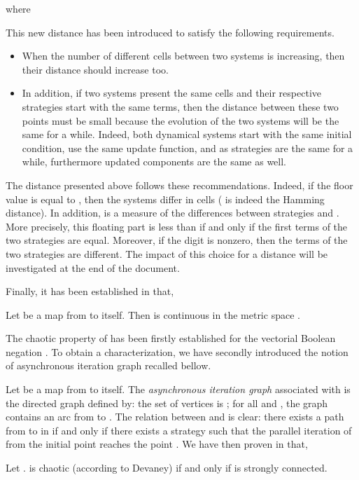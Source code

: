 \documentclass{article}
\begin{document}
\noindent where



This new distance has been introduced to satisfy the following requirements.
\begin{itemize}
\item When the number of different cells between two systems is increasing, then
their distance should increase too.
\item In addition, if two systems present the same cells and their respective
strategies start with the same terms, then the distance between these two points
must be small because the evolution of the two systems will be the same for a
while. Indeed, both dynamical systems start with the same initial condition,
use the same update function, and as strategies are the same for a while, furthermore
updated components are the same as well.
\end{itemize}
The distance presented above follows these recommendations. Indeed, if the floor
value  is equal to , then the systems 
differ in  cells ( is indeed the Hamming distance). In addition,  is a
measure of the differences between strategies  and . More
precisely, this floating part is less than  if and only if the first
 terms of the two strategies are equal. Moreover, if the  digit is
nonzero, then the  terms of the two strategies are different.
The impact of this choice for a distance will be investigated at the end of the document.

Finally, it has been established in \cite{guyeux10} that,

\begin{proposition}
Let  be a map from  to itself. Then  is continuous in
the metric space .
\end{proposition}

The chaotic property of  has been firstly established for the vectorial
Boolean negation  \cite{guyeux10}. To obtain a characterization, we have secondly
introduced the notion of asynchronous iteration graph recalled bellow.

Let  be a map from  to itself. The
{\emph{asynchronous iteration graph}} associated with  is the
directed graph  defined by: the set of vertices is
; for all  and 
,
the graph  contains an arc from  to . 
The relation between  and  is clear: there exists a
path from  to  in  if and only if there exists a
strategy  such that the parallel iteration of  from the
initial point  reaches the point .
We have then proven in \cite{bcgr11:ip} that,


\begin{theorem}
\label{Th:Caractérisation   des   IC   chaotiques}  
Let .  is chaotic  (according to  Devaney) 
if and only if  is strongly connected.
\end{theorem}
\end{document}
